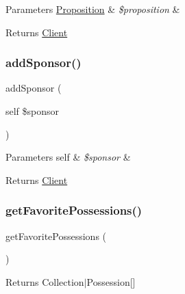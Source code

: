 \begin{DoxyParams}[1]{Parameters}
\mbox{\hyperlink{class_app_1_1_entity_1_1_proposition}{Proposition}} & {\em \$proposition} & \\
\hline
\end{DoxyParams}
\begin{DoxyReturn}{Returns}
\mbox{\hyperlink{class_app_1_1_entity_1_1_client}{Client}} 
\end{DoxyReturn}
\mbox{\label{class_app_1_1_entity_1_1_client_a1f696555faa7189d600a8d4e8cba8115}} 
\subsubsection{\texorpdfstring{addSponsor()}{addSponsor()}}
{\footnotesize\ttfamily add\+Sponsor (\begin{DoxyParamCaption}\item[{self}]{\$sponsor }\end{DoxyParamCaption})}


\begin{DoxyParams}[1]{Parameters}
self & {\em \$sponsor} & \\
\hline
\end{DoxyParams}
\begin{DoxyReturn}{Returns}
\mbox{\hyperlink{class_app_1_1_entity_1_1_client}{Client}} 
\end{DoxyReturn}
\mbox{\label{class_app_1_1_entity_1_1_client_acdb317199da967d0426a4842d500430a}} 
\subsubsection{\texorpdfstring{getFavoritePossessions()}{getFavoritePossessions()}}
{\footnotesize\ttfamily get\+Favorite\+Possessions (\begin{DoxyParamCaption}{ }\end{DoxyParamCaption})}

\begin{DoxyReturn}{Returns}
Collection$\vert$\+Possession\mbox{[}\mbox{]} 
\end{DoxyReturn}
\mbox{\label{class_app_1_1_entity_1_1_client_a645f4955cea1e0f521355b8128dad326}} 

